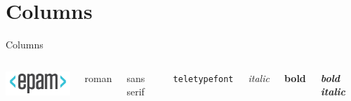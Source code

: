 \section{Columns}

\begin{frame}{Columns}
	\begin{columns}
		\center\includegraphics[width=3cm]{epam}
		
		{\rmfamily roman}
		
		{\sffamily sans serif}
		
		{\tt teletypefont}
		
		{\it italic}
		
		{\bf bold}
		
		\textit{\textbf{bold italic}}
	\end{columns}
\end{frame}


